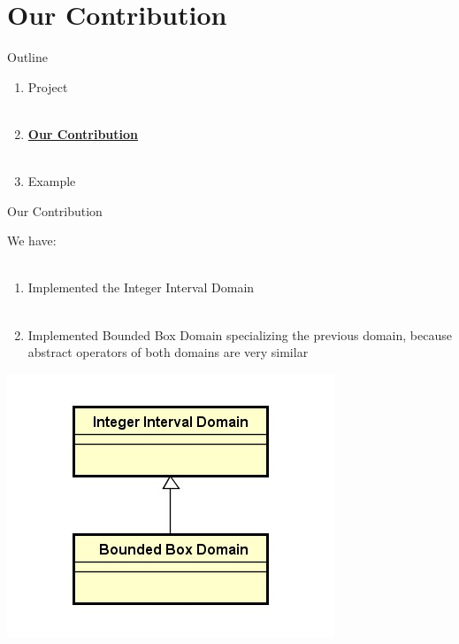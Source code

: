 \documentclass{beamer}
\begin{document}
	\section{Our Contribution}
	\begin{frame}{Outline}
\Large
		\begin{enumerate}
			\item Project \\~\\
			\item \textbf{\underline{Our Contribution}} \\~\\
			\item Example

		\end{enumerate}
	\end{frame}
\normalsize
	\begin{frame}{Our Contribution}

	We have:\\~\\
	\begin{enumerate}
		\item Implemented the Integer Interval Domain\\~\\
		\item Implemented Bounded Box Domain specializing the previous domain, because abstract operators of both domains are very similar
	\end{enumerate}
\centering
		\includegraphics[scale=0.47]{images/gerarchia.jpg}\\
	
	\end{frame}
\end{document}
